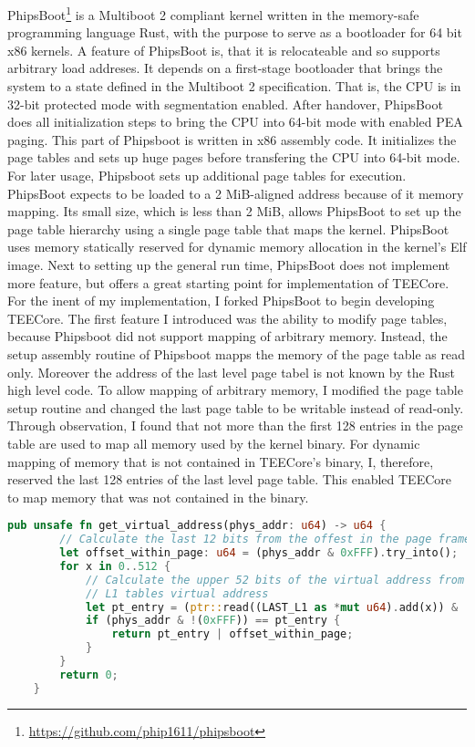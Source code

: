 PhipsBoot\footnote{\url{https://github.com/phip1611/phipsboot}} is a Multiboot 2
compliant kernel written in the memory-safe programming language Rust, with the
purpose to serve as a bootloader for 64 bit x86 kernels. A feature of PhipsBoot
is, that it is relocateable and so supports arbitrary load addreses. It depends
on a first-stage bootloader
that brings the system to a state defined in the Multiboot 2 specification. That
is, the CPU is in 32-bit protected mode with segmentation enabled. After
handover, PhipsBoot does all initialization steps to bring the CPU into 64-bit
mode with enabled PEA paging. This part of Phipsboot is written in x86 assembly
code. It initializes the page tables and sets up huge pages before transfering
the CPU into 64-bit mode. For later usage, Phipsboot sets up additional page
tables for execution. PhipsBoot expects to be loaded to a 2 MiB-aligned address
because of it memory mapping. Its small size, which is less than 2 MiB, allows
PhipsBoot to set up the page table hierarchy using a single page table that maps
the kernel. PhipsBoot uses memory statically reserved for dynamic memory
allocation in the kernel's Elf image. Next to setting up the general run time,
PhipsBoot does not implement more feature, but offers a great starting point for
implementation of TEECore. \\

For the inent of my implementation, I forked PhipsBoot to begin developing
TEECore. The first feature I introduced was the ability to modify page tables,
because Phipsboot did not support mapping of arbitrary memory. Instead, the
setup assembly routine of Phipsboot mapps the memory of the page table as read
only. Moreover the address of the last level page tabel is not known by the Rust
high level code. To allow mapping of arbitrary memory, I modified the page table
setup routine and changed the last page table to be writable instead of
read-only. Through observation, I found that not more than the first 128 entries
in the page table are used to map all memory used by the kernel binary. For
dynamic mapping of memory that is not contained in TEECore's binary, I,
therefore, reserved the last 128 entries of the last level page table. This
enabled TEECore to map memory that was not contained in the binary.
\begin{lstlisting}[language=Rust, caption=Mapping of external memory]
    pub unsafe fn get_virtual_address(phys_addr: u64) -> u64 {
        // Calculate the last 12 bits from the offest in the page frame
        let offset_within_page: u64 = (phys_addr & 0xFFF).try_into();
        for x in 0..512 {
            // Calculate the upper 52 bits of the virtual address from the
            // L1 tables virtual address
            let pt_entry = (ptr::read((LAST_L1 as *mut u64).add(x)) & !(0xFFF)) & !(0x1_u64 << 63);
            if (phys_addr & !(0xFFF)) == pt_entry {
                return pt_entry | offset_within_page;
            }
        }
        return 0;
    }
\end{lstlisting}

